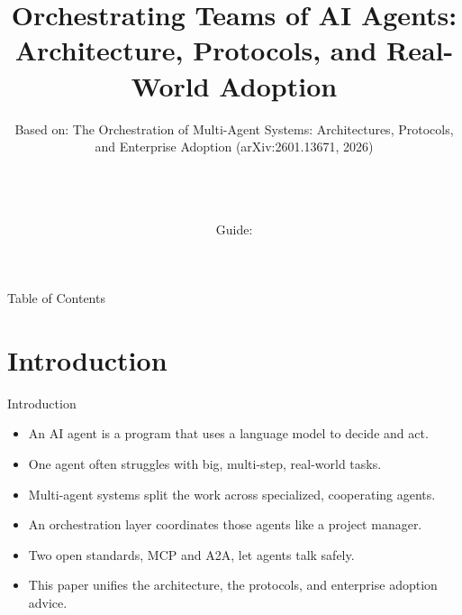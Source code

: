 \documentclass[10pt]{beamer}
\title[B.Tech Seminar]{Orchestrating Teams of AI Agents: Architecture, Protocols, and Real-World Adoption}
\subtitle{Based on: The Orchestration of Multi-Agent Systems: Architectures, Protocols, and Enterprise Adoption (arXiv:2601.13671, 2026)}
\author[\studentname\ (\shortinst)]{\studentname \\ \small \rollno \\ \small \rollclass \\ \small Guide: \guidename}
\institute[]{\deptname \\ \collegename}
\date{\seminardate}
\begin{document}
\begin{frame}[plain]
  \titlepage
\end{frame}
\begin{frame}{Table of Contents}
  \tableofcontents
\end{frame}
\section{Introduction}
\begin{frame}{Introduction}
\begin{itemize}
  \item An AI agent is a program that uses a language model to decide and act.
  \item One agent often struggles with big, multi-step, real-world tasks.
  \item Multi-agent systems split the work across specialized, cooperating agents.
  \item An orchestration layer coordinates those agents like a project manager.
  \item Two open standards, MCP and A2A, let agents talk safely.
  \item This paper unifies the architecture, the protocols, and enterprise adoption advice.
\end{itemize}
\end{frame}
\end{document}
